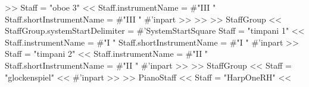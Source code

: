 \documentclass[../../LilyPond-Tutorials]{subfiles}
\begin{document}
\begin{lilypondcode}
{                                   >> %
                                   \new Staff = "oboe 3" \with { \ShowEmptyStaves } << 
                                          \set Staff.instrumentName = #"III "
                                          \set Staff.shortInstrumentName = #"III "
                                          \removeWithTag #'inpart { 
                                                 \killCues { \OboeThree } }
                                   >> %
                     >> %
              >>
                     \new StaffGroup \with { 
                            \TimpaniHeading 
                            \BracketinSingleStaff 
                            \BetweenGroupSpacing } <<
                                   \set StaffGroup.systemStartDelimiter = #'SystemStartSquare
                                   \new Staff = "timpani 1" \with { \ShowEmptyStaves } << 
                                          \set Staff.instrumentName = #"I "
                                          \set Staff.shortInstrumentName = #"I "
                                          \removeWithTag #'inpart { \killCues { \TimpaniOne } }
                                   >> %
                                   \new Staff = "timpani 2" \with { \ShowEmptyStaves } << 
                                          \set Staff.instrumentName = #"II "
                                          \set Staff.shortInstrumentName = #"II "
                                          \removeWithTag #'inpart { \killCues { \TimpaniTwo } }
                                   >> %
              >> %
              \new StaffGroup  \with { \BracketinSingleStaff \BetweenGroupSpacing } <<
                     \new Staff = "glockenspiel" \with { \HideEmptyStaves } <<
                            \GlockenspielHeading
                            \removeWithTag #'inpart { \killCues { \Glockenspiel } }
                     >> %
              >> %
              \new PianoStaff \with { \HarpsHeading \KeyboardStaffSpacing } <<
                     \new Staff = "HarpOneRH" \with { 
                            \ShowEmptyStaves } << 
}
\end{lilypondcode}
\end{document}
